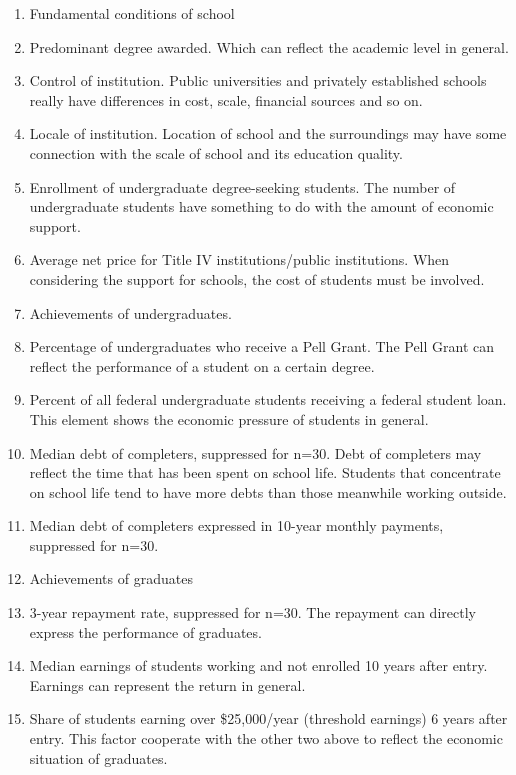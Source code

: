 \begin{enumerate}
	\item Fundamental conditions of school
	\item Predominant degree awarded. Which can reflect the academic level in general.
	\item Control of institution. Public universities and privately established schools really have differences in cost, scale, financial sources and so on.
	\item Locale of institution. Location of school and the surroundings may have some connection with the scale of school and its education quality.
	\item Enrollment of undergraduate degree-seeking students. The number of undergraduate students have something to do with the amount of economic support.
	\item Average net price for Title IV institutions/public institutions. When considering the support for schools, the cost of students must be involved.
	\item Achievements of undergraduates.
	\item Percentage of undergraduates who receive a Pell Grant. The Pell Grant can reflect the performance of a student on a certain degree.

	\item Percent of all federal undergraduate students receiving a federal student loan. This element shows the economic pressure of students in general.
	\item Median debt of completers, suppressed for n=30. Debt of completers may reflect the time that has been spent on school life. Students that concentrate on school life tend to have more debts than those meanwhile working outside.
	\item Median debt of completers expressed in 10-year monthly payments, suppressed for n=30.
	\item Achievements of graduates
	\item 3-year repayment rate, suppressed for n=30. The repayment can directly express the performance of graduates.
	\item Median earnings of students working and not enrolled 10 years after entry. Earnings can represent the return in general.
	\item Share of students earning over \$25,000/year (threshold earnings) 6 years after entry. This factor cooperate with the other two above to reflect the economic situation of graduates.

\end{enumerate}

